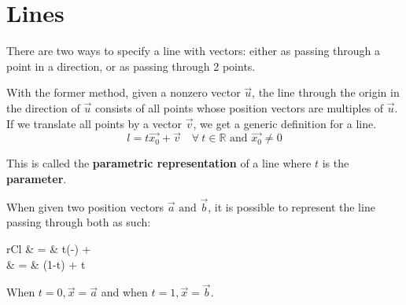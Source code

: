 \documentclass[11pt]{article}
\begin{document}
\section{Lines}
	There are two ways to specify a line with vectors: either as passing through a point in a direction, or as passing through 2 points.
	
	With the former method, given a nonzero vector $\vec{u}$, the line through the origin in the direction of $\vec{u}$ consists of all points whose position vectors are multiples of $\vec{u}$. If we translate all points by a vector $\vec{v}$, we get a generic definition for a line.
	\begin{equation}
		l = t\vec{x_0} + \vec{v} \quad \forall \ t \in \mathbb{R} \text{ and } \vec{x_0}\neq 0
	\end{equation}
	
	This is called the \textbf{parametric representation} of a line where $t$ is the \textbf{parameter}.
	
	\begin{center}
	\end{center}
	
	When given two position vectors $\vec{a} \text{ and } \vec{b}$, it is possible to represent the line passing through both as such:
	
	\begin{IEEEeqnarray}{rCl}
		 & = & t(-\vec{a}) + \\
		 & = & (1-t) + t
	\end{IEEEeqnarray}
	
	When $t=0, \vec{x} = \vec{a}$ and when $t=1, \vec{x} = \vec{b}$.
	
\end{document}
